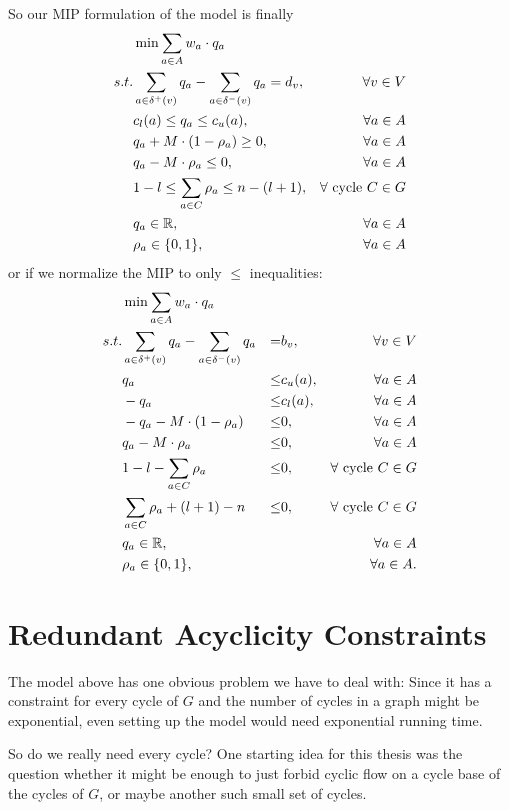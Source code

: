 So our MIP formulation of the model is finally
\begin{align*}
 &\min \sum_{a\in A} w_a\cdot q_a & \\
 s.t. & \sum_{a\in \delta^+(v)}q_a - \sum_{a\in\delta^- (v)}q_a = d_v,\, &\forall v\in V \\
  & c_l(a)\le q_a \le c_u(a), & \forall a\in A\\
 &q_a + M\cdot (1-\rho_a) \ge 0, & \forall a\in A\\
 &q_a - M\cdot \rho_a \le 0, & \forall a\in A\\
 &1-l \le \sum_{a\in C}\rho_a \le n-(l+1), & \forall \textrm{ cycle }C\in G\\
 & q_a \in \mathbb{R}, &\forall a\in A\\
 & \rho_a \in \{0,1\}, &\forall a\in A
\end{align*}
or if we normalize the MIP to only $\le$ inequalities:
\begin{align}
 &\min \sum_{a\in A} w_a\cdot q_a & \\
 s.t. & \sum_{a\in \delta^+(v)}q_a - \sum_{a\in\delta^- (v)}q_a &=& b_v,\ &\forall v\in V \\
 & q_a &\le& c_u(a), & \forall a\in A\\
 & -q_a &\le& c_l(a), & \forall a\in A\\
 &-q_a - M\cdot (1-\rho_a) &\le& 0, & \forall a\in A\\
 &q_a - M\cdot \rho_a &\le& 0, & \forall a\in A\\
 &1-l - \sum_{a\in C}\rho_a &\le& 0 ,& \forall \textrm{ cycle }C\in G\\
 & \sum_{a\in C}\rho_a +(l+1)-n &\le& 0, & \forall \textrm{ cycle }C\in G\\
 & q_a \in \mathbb{R}, & & &\forall a\in A\\
 & \rho_a \in \{0,1\}, & & &\forall a\in A.
\end{align}


\section{Redundant Acyclicity Constraints}
The model above has one obvious problem we have to deal with: Since it has a constraint for every cycle of $G$ and the 
number of cycles in a graph might be exponential, even setting up the model would need exponential running time. 

So do we really need every cycle? One starting idea for this thesis was the question whether it might be enough to just 
forbid cyclic flow on a cycle base of the cycles of $G$, or maybe another such small set of cycles.

